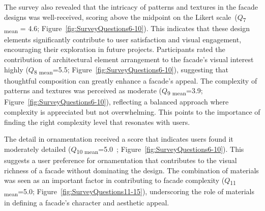 The survey also revealed that the intricacy of patterns and textures in the facade designs was well-received, scoring above the midpoint on the Likert scale~(\(Q\)\textsubscript{\small{7 mean}} = 4.6; Figure~\ref{fig:SurveyQuestions6-10}). This indicates that these design elements significantly contribute to user satisfaction and visual engagement, encouraging their exploration in future projects.
Participants rated the contribution of architectural element arrangement to the facade's visual interest highly (\(Q\)\textsubscript{\small{8 mean}}=5.5; Figure~\ref{fig:SurveyQuestions6-10}), suggesting that thoughtful composition can greatly enhance a facade's appeal.
The complexity of patterns and textures was perceived as moderate (\(Q\)\textsubscript{\small{9 mean}}=3.9; Figure~\ref{fig:SurveyQuestions6-10}), reflecting a balanced approach where complexity is appreciated but not overwhelming.
This points to the importance of finding the right complexity level that resonates with users.

The detail in ornamentation received a score that indicates users found it moderately detailed  (\(Q\)\textsubscript{\small{10 mean}}=5.0~; Figure~\ref{fig:SurveyQuestions6-10}).
This suggests a user preference for ornamentation that contributes to the visual richness of a facade without dominating the design.
The combination of materials was seen as an important factor in contributing to facade complexity (\(Q\)\textsubscript{\small{11 mean}}=5.0; Figure~\ref{fig:SurveyQuestions11-15}), underscoring the role of materials in defining a facade's character and aesthetic appeal.

